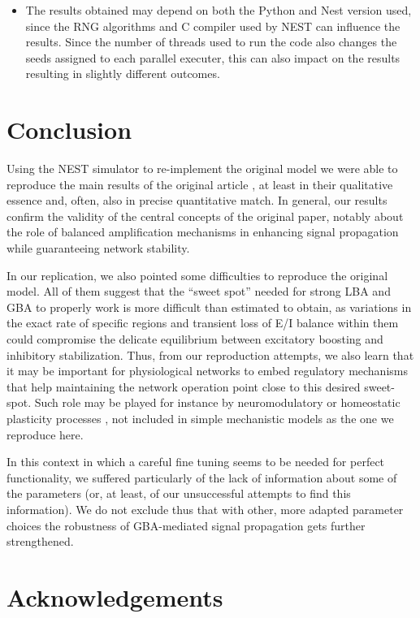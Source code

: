 \begin{itemize}
    \item The results obtained may depend on both the Python and Nest version used, since the RNG algorithms and C compiler used by NEST can influence the results. Since the number of threads used to run the code also changes the seeds assigned to each parallel executer, this can also impact on the results resulting in slightly different outcomes.
    
\end{itemize}

\section{Conclusion}

Using the NEST simulator to re-implement  the original model we were able to reproduce the main results of the original article \cite{joglekar2018inter}, at least in their qualitative essence and, often, also in precise quantitative match. In general, our results confirm the validity of the central concepts of the original paper, notably about the role of balanced amplification mechanisms in enhancing signal propagation while guaranteeing network stability. 

In our replication, we also pointed some difficulties to reproduce the original model. All of them suggest that the ``sweet spot'' needed for strong LBA and GBA to properly work is more difficult than estimated to obtain, as variations in the exact rate of specific regions and transient loss of E/I balance within them could compromise the delicate equilibrium between excitatory boosting and inhibitory stabilization. Thus, from our reproduction attempts, we also learn that it may be important for physiological networks to embed regulatory mechanisms that help maintaining the network operation point close to this desired sweet-spot. Such role may be played for instance by neuromodulatory or homeostatic plasticity processes \cite{ShineTICS, SjostromTINS}, not included in simple mechanistic models as the one we reproduce here.

In this context in which a careful fine tuning seems to be needed for perfect functionality, we suffered particularly of the lack of information about some of the parameters (or, at least, of our unsuccessful attempts to find this information). We do not exclude thus that with other, more adapted parameter choices the robustness of GBA-mediated signal propagation gets further strengthened.

\section{Acknowledgements}

